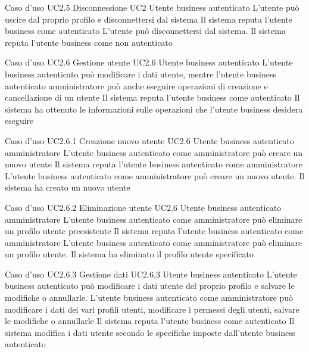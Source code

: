 \UCtitle
{Caso d'uso UC2.5}
{Disconnessione}
\UC
{UC2}
{Utente business autenticato}
{L'utente può uscire dal proprio profilo e disconnettersi dal sistema}
{Il sistema reputa l'utente business come autenticato}
\scenario
{L'utente può disconnettersi dal sistema.}
\post
{Il sistema reputa l'utente business come non autenticato}

\UCtitle
{Caso d'uso UC2.6}
{Gestione utente}
\UC
{UC2.6}
{Utente business autenticato}
{L'utente business autenticato può modificare i dati utente, mentre l'utente business autenticato amministratore può anche eseguire operazioni di creazione e cancellazione di un utente}
{Il sistema reputa l'utente business come autenticato}
\post
{Il sistema ha ottenuto le informazioni sulle operazioni che l'utente business desidera eseguire}

\UCtitle
{Caso d'uso UC2.6.1}
{Creazione nuovo utente}
\UC
{UC2.6}
{Utente business autenticato amministratore}
{L'utente business autenticato come amministratore può creare un nuovo utente}
{Il sistema reputa l'utente business autenticato come amministratore}
\scenario
{L'utente business autenticato come amministratore può creare un nuovo utente.}
\post
{Il sistema ha creato un nuovo utente}


\UCtitle
{Caso d'uso UC2.6.2}
{Eliminazione utente}
\UC
{UC2.6}
{Utente business autenticato amministratore}
{L'utente business autenticato come amministratore può eliminare un profilo utente preesistente}
{Il sistema reputa l'utente business autenticato come amministratore}
\scenario
{L'utente business autenticato come amministratore può eliminare un profilo utente.}
\post
{Il sistema ha eliminato il profilo utente specificato}

\UCtitle
{Caso d'uso UC2.6.3}
{Gestione dati}
\UC
{UC2.6.3}
{Utente business autenticato}
{L'utente business autenticato può modificare i dati utente del proprio profilo e salvare le modifiche o annullarle. L'utente business autenticato come amministratore può modificare i dati dei vari profili utenti, modificare i permessi degli utenti, salvare le modifiche o annullarle}
{Il sistema reputa l'utente business come autenticato}
\post
{Il sistema modifica i dati utente secondo le specifiche imposte dall'utente business autenticato}

